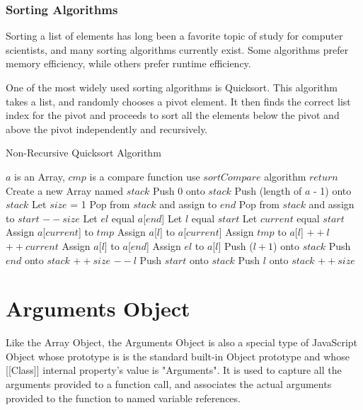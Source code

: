\documentclass[a4paper,11pt,twoside]{report}
\begin{document}
\subsection{Sorting Algorithms}
Sorting a list of elements has long been a favorite topic of study for computer scientists, and many sorting algorithms currently exist. Some algorithms prefer memory efficiency, while others prefer runtime efficiency. 

One of the most widely used sorting algorithms is Quicksort. This algorithm takes a list, and randomly chooses a pivot element. It then finds the correct list index for the pivot and proceeds to sort all the elements below the pivot and above the pivot independently and recursively.

\begin{algorithm}
\caption{Non-Recursive Quicksort Algorithm}
\begin{algorithmic}
\REQUIRE $a$ is an Array, $cmp$ is a compare function
\STATE use $sortCompare$ algorithm
\ENDIF
{}
\STATE $return$
\ENDIF
\STATE Create a new Array named $stack$
\STATE Push 0 onto $stack$
\STATE Push (length of $a$ - 1) onto $stack$
\STATE Let $size$ = 1
\STATE Pop from $stack$ and assign to $end$
\STATE Pop from $stack$ and assign to $start$
\STATE $--size$
\STATE Let $el$ equal $a$[$end$]
\STATE Let $l$ equal $start$
\STATE Let $current$ equal $start$
\STATE Assign $a$[$current$] to $tmp$
\STATE Assign $a$[$l$] to $a$[$current$]
\STATE Assign $tmp$ to $a$[$l$]
\STATE $++l$
\ENDIF
\STATE $++current$
\ENDWHILE
\STATE Assign $a$[$l$] to $a$[$end$]
\STATE Assign $el$ to $a$[$l$]
\STATE Push ($l + 1$) onto $stack$
\STATE Push $end$ onto $stack$
\STATE $++size$
\ENDIF
\STATE $--l$
\STATE Push $start$ onto $stack$
\STATE Push $l$ onto $stack$
\STATE $++size$
\ENDIF
\ENDWHILE
\end{algorithmic}
\end{algorithm}


\chapter{Arguments Object}\label{sec:argobj}
Like the Array Object, the Arguments Object is also a special type of JavaScript Object whose prototype is is the standard built-in Object prototype and whose [[Class]] internal property's value is "Arguments". It is used to capture all the arguments provided to a function call, and associates the actual arguments provided to the function to named variable references. 
\end{document}
